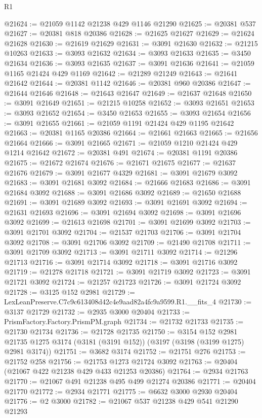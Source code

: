 \begin{lexlean}{R1}
\begin{coremodule}
@21624 := @21059 @1142 @21238 @429 @1146 @21290
@21625 := @20381 @537
@21627 := @20381 @818 @20386
@21628 := @21625 @21627
@21629 := @21624 @21628
@21630 := @21619 @21629
@21631 := @3091 @21630
@21632 := @21215 @10263
@21633 := @3093 @21632
@21634 := @3093 @21633
@21635 := @3450 @21634
@21636 := @3093 @21635
@21637 := @3091 @21636
@21641 := @21059 @1165 @21424 @429 @1169
@21642 := @21289 @21249
@21643 := @21641 @21642
@21644 := @20381 @1142
@21646 := @20381 @960 @20386
@21647 := @21644 @21646
@21648 := @21643 @21647
@21649 := @21637 @21648
@21650 := @3091 @21649
@21651 := @21215 @10258
@21652 := @3093 @21651
@21653 := @3093 @21652
@21654 := @3450 @21653
@21655 := @3093 @21654
@21656 := @3091 @21655
@21661 := @21059 @1191 @21424 @429 @1195 @21642
@21663 := @20381 @1165 @20386
@21664 := @21661 @21663
@21665 := @21656 @21664
@21666 := @3091 @21665
@21671 := @21059 @1210 @21424 @429 @1214 @21642
@21672 := @20381 @491
@21674 := @20381 @1191 @20386
@21675 := @21672 @21674
@21676 := @21671 @21675
@21677 := @21637 @21676
@21679 := @3091 @21677 @4329
@21681 := @3091 @21679 @3092
@21683 := @3091 @21681 @3092
@21684 := @21666 @21683
@21686 := @3091 @21684 @3092
@21688 := @3091 @21686 @3092
@21689 := @21650 @21688
@21691 := @3091 @21689 @3092
@21693 := @3091 @21691 @3092
@21694 := @21631 @21693
@21696 := @3091 @21694 @3092
@21698 := @3091 @21696 @3092
@21699 := @21613 @21698
@21701 := @3091 @21699 @3092
@21703 := @3091 @21701 @3092
@21704 := @21537 @21703
@21706 := @3091 @21704 @3092
@21708 := @3091 @21706 @3092
@21709 := @21490 @21708
@21711 := @3091 @21709 @3092
@21713 := @3091 @21711 @3092
@21714 := @21296 @21713
@21716 := @3091 @21714 @3092
@21718 := @3091 @21716 @3092
@21719 := @21278 @21718
@21721 := @3091 @21719 @3092
@21723 := @3091 @21721 @3092
@21724 := @21257 @21723
@21726 := @3091 @21724 @3092
@21728 := @3125 @152 @2981
@21729 := LexLeanPreserve.C7c9c613408d42c4e9aad82a4fc9a9599.R1.__fits_4
@21730 := @3137 @21729
@21732 := @2935 @3000 @20404
@21733 := PrismFactory.Factory.PrismPM.graph
@21734 := @21732 @21733
@21735 := @21730 @21734
@21736 := @21728 @21735
@21750 := @3154
    @152
    @2981
    @21735
    @1275
    @3174
    (@3181 (@3191 @152))
    (@3197 (@3198 (@3199 @1275) @2981 @3174))
@21751 := @3682 @3174
@21752 := @21751 @276
@21753 := @21752 @258
@21756 := @21753 @1273 @21724 @3092
@21763 := @20404 (@21067 @422 @21238 @429 @433 @21253 @20386)
@21764 := @2934 @21763
@21770 := @21067 @491 @21238 @495 @499 @21274 @20386
@21771 := @20404 @21770
@21772 := @2934 @21771
@21775 := @6632 @3000 @2930 @20404
@21776 := @2 @3000
@21782 := @21067 @537 @21238 @429 @541 @21290 @21293

\end{coremodule}
\end{lexlean}
